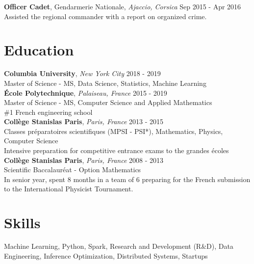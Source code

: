 \documentclass[a4paper,9pt]{article}
\begin{document}
    \noindent\textbf{Officer Cadet}, Gendarmerie Nationale, \textit{Ajaccio, Corsica} \hfill Sep 2015 - Apr 2016\\
    Assisted the regional commander with a report on organized crime.

    \section*{Education}

    \noindent\textbf{Columbia University}, \textit{New York City} \hfill 2018 - 2019\\
    Master of Science - MS, Data Science, Statistics, Machine Learning\\

    \noindent\textbf{École Polytechnique}, \textit{Palaiseau, France} \hfill 2015 - 2019\\
    Master of Science - MS, Computer Science and Applied Mathematics\\
    \#1 French engineering school\\

    \noindent\textbf{Collège Stanislas Paris}, \textit{Paris, France} \hfill 2013 - 2015\\
    Classes préparatoires scientifiques (MPSI - PSI*), Mathematics, Physics, Computer Science\\
    Intensive preparation for competitive entrance exams to the grandes écoles\\

    \noindent\textbf{Collège Stanislas Paris}, \textit{Paris, France} \hfill 2008 - 2013\\
    Scientific Baccalauréat - Option Mathematics\\
    In senior year, spent 8 months in a team of 6 preparing for the French submission to the International Physicist Tournament.

    \section*{Skills}
    Machine Learning, Python, Spark, Research and Development (R\&D), Data Engineering, Inference Optimization, Distributed Systems, Startups
\end{document}
